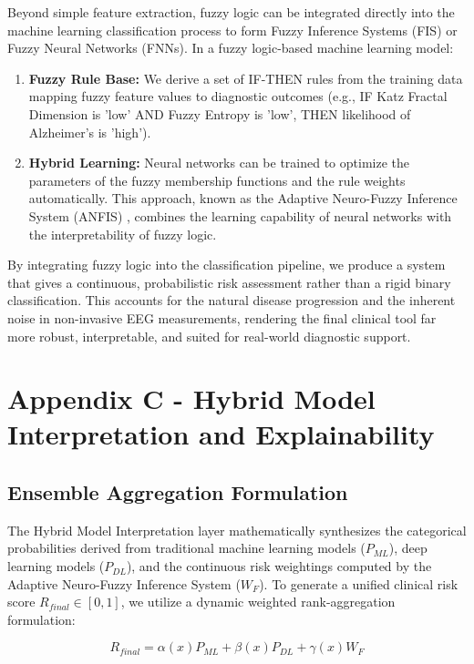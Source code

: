\documentclass[openany]{book}
\begin{document}
Beyond simple feature extraction, fuzzy logic can be integrated directly into the machine learning classification process to form Fuzzy Inference Systems (FIS) or Fuzzy Neural Networks (FNNs). In a fuzzy logic-based machine learning model:
\begin{enumerate}
    \item \textbf{Fuzzy Rule Base:} We derive a set of IF-THEN rules from the training data mapping fuzzy feature values to diagnostic outcomes (e.g., IF Katz Fractal Dimension is 'low' AND Fuzzy Entropy is 'low', THEN likelihood of Alzheimer's is 'high').
    \item \textbf{Hybrid Learning:} Neural networks can be trained to optimize the parameters of the fuzzy membership functions and the rule weights automatically. This approach, known as the Adaptive Neuro-Fuzzy Inference System (ANFIS) \cite{jang1993anfis}, combines the learning capability of neural networks with the interpretability of fuzzy logic.
\end{enumerate}
By integrating fuzzy logic into the classification pipeline, we produce a system that gives a continuous, probabilistic risk assessment rather than a rigid binary classification. This accounts for the natural disease progression and the inherent noise in non-invasive EEG measurements, rendering the final clinical tool far more robust, interpretable, and suited for real-world diagnostic support.

\chapter*{Appendix C - Hybrid Model Interpretation and Explainability}
\label{app:C}

\section{Ensemble Aggregation Formulation}
\label{sec:ensemble}
The Hybrid Model Interpretation layer mathematically synthesizes the categorical probabilities derived from traditional machine learning models ($P_{ML}$), deep learning models ($P_{DL}$), and the continuous risk weightings computed by the Adaptive Neuro-Fuzzy Inference System ($W_F$). To generate a unified clinical risk score $R_{final} \in [0,1]$, we utilize a dynamic weighted rank-aggregation formulation:

\begin{equation}
    R_{final} = \alpha(x) P_{ML} + \beta(x) P_{DL} + \gamma(x) W_F
\end{equation}
\end{document}
